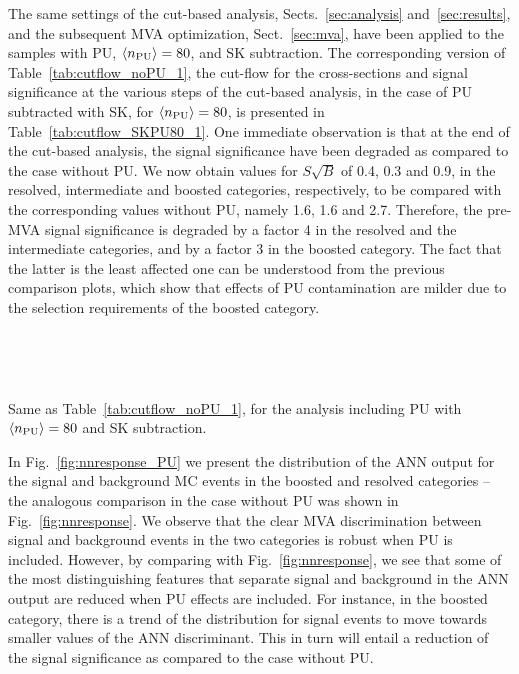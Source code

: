 The same settings of the cut-based analysis,
Sects.~\ref{sec:analysis} and~\ref{sec:results}, and
the subsequent MVA optimization, Sect.~\ref{sec:mva}, have
been applied to the samples with PU, $\left\langle n_{\rm PU}\right\rangle=80$,
and SK subtraction.
%
The corresponding version of Table~\ref{tab:cutflow_noPU_1}, the 
cut-flow for the cross-sections and signal significance at the various
steps of the cut-based analysis, 
in the case
of PU subtracted with SK, for $\left\langle n_{\rm PU}\right\rangle=80$,
is presented in Table~\ref{tab:cutflow_SKPU80_1}.
%
One immediate observation is that
at the end of the cut-based analysis,
the signal significance have been  degraded
as compared to the case without PU.
%
We now obtain values for $S\sqrt{B}$ of 0.4, 0.3 and 0.9, in the resolved,
intermediate and boosted categories, respectively, to be compared
with the corresponding values without PU, namely 1.6, 1.6 and 2.7.
%
Therefore, the pre-MVA signal significance is degraded by a factor 4 in
the resolved and the intermediate categories,
and by a factor 3 in the boosted category.
%
The fact that the latter is the  least affected one
can be understood from the previous comparison
plots, which show that effects of PU contamination
are milder due to the  selection requirements
of the boosted category.

\begin{table}[t]
  \centering
  \scriptsize
  
  $\,$ \\
  \vspace{0.5cm}
  
  $\,$ \\
  \vspace{0.5cm}
    
    \caption{\small
      Same as Table~\ref{tab:cutflow_noPU_1}, for the analysis
      including PU with $\left\langle n_{\rm PU}\right\rangle=80$ and SK subtraction.
      \label{tab:cutflow_SKPU80_1}}
\end{table}


In Fig.~\ref{fig:nnresponse_PU} we present
the distribution of the ANN output for the
signal and background MC events in the boosted and resolved categories --
the analogous comparison in the case without PU was shown
in Fig.~\ref{fig:nnresponse}.
%
We observe that the clear MVA discrimination
between signal and background events in the two categories is robust
when PU is included.
%
However, by comparing with Fig.~\ref{fig:nnresponse}, we see
that some of the most distinguishing features that separate signal
and background in the ANN output are reduced when PU effects
are included.
%
For instance, in the boosted category, there is a trend of the distribution
for signal events to move towards smaller values of the
ANN discriminant.
%
This in turn will entail a reduction of the signal significance as
compared to the case without PU.

